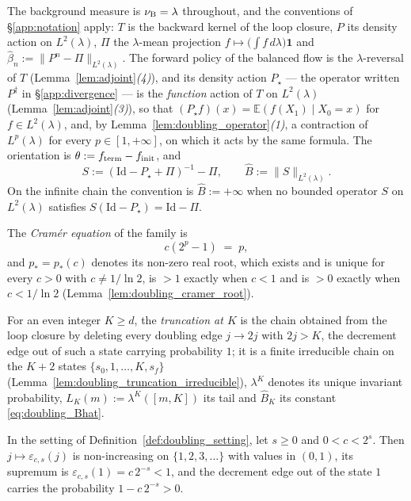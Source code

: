 \begin{definition}
The background measure is $\nu_{\mathrm{B}}=\lambda$ throughout, and the conventions of
\S\ref{app:notation} apply: $T$ is the backward kernel of the loop closure, $P$ its density
action on $L^2(\lambda)$, $\Pi$ the $\lambda$-mean projection
$f\mapsto\bigl(\int f\,d\lambda\bigr)\mathbf 1$ and
$\widehat\beta_n:=\|P^n-\Pi\|_{L^2(\lambda)}$. The forward policy of the balanced flow is the
$\lambda$-reversal of $T$ (Lemma~\ref{lem:adjoint}\emph{(4)}), and its density action $P_\star$
--- the operator written $P^\dagger$ in \S\ref{app:divergence} --- is the \emph{function} action
of $T$ on $L^2(\lambda)$ (Lemma~\ref{lem:adjoint}\emph{(3)}), so that
$(P_\star f)(x)=\mathbb E(f(X_1)\mid X_0=x)$ for $f\in L^2(\lambda)$, and, by
Lemma~\ref{lem:doubling_operator}\emph{(1)}, a contraction of $L^p(\lambda)$ for every
$p\in[1,+\infty]$, on which it acts by the same formula. The orientation is
$\theta:=f_{\mathrm{term}}-f_{\mathrm{init}}$, and
\begin{equation}\label{eq:doubling_Bhat}
    S:=\left(\mathrm{Id}-P_\star+\Pi\right)^{-1}-\Pi,\qquad
    \widehat B:=\|S\|_{L^2(\lambda)} .
\end{equation}
On the infinite chain the convention is $\widehat B:=+\infty$ when no bounded operator $S$ on
$L^2(\lambda)$ satisfies $S(\mathrm{Id}-P_\star)=\mathrm{Id}-\Pi$.

The \emph{Cram\'er equation} of the family is
\begin{equation}\label{eq:doubling_cramer}
    c\left(2^p-1\right)\;=\;p ,
\end{equation}
and $p_*=p_*(c)$ denotes its non-zero real root, which exists and is unique for every $c>0$
with $c\neq1/\ln2$, is $>1$ exactly when $c<1$ and is $>0$ exactly when $c<1/\ln2$
(Lemma~\ref{lem:doubling_cramer_root}).

For an even integer $K\geq d$, the \emph{truncation at $K$} is the chain obtained from the loop
closure by deleting every doubling edge $j\rightarrow2j$ with $2j>K$, the decrement edge out of
such a state carrying probability $1$; it is a finite irreducible chain on the $K+2$ states
$\{s_0,1,\dots,K,s_f\}$ (Lemma~\ref{lem:doubling_truncation_irreducible}), $\lambda^K$ denotes its
unique invariant probability, $L_K(m):=\lambda^K([m,K])$ its tail and $\widehat B_K$ its
constant \eqref{eq:doubling_Bhat}.
\end{definition}

\begin{lemma}\label{lem:doubling_range}
In the setting of Definition~\ref{def:doubling_setting}, let $s\geq0$ and $0<c<2^s$. Then
$j\mapsto\varepsilon_{c,s}(j)$ is non-increasing on $\{1,2,3,\dots\}$ with values in $(0,1)$,
its supremum is $\varepsilon_{c,s}(1)=c\,2^{-s}<1$, and the decrement edge out of the state $1$
carries the probability $1-c\,2^{-s}>0$.
\end{lemma}

